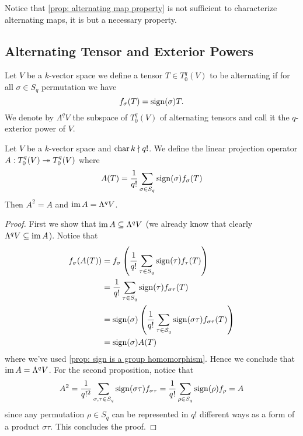 \begin{remark}
  Notice that \cref{prop: alternating map property} is not sufficient to
  characterize alternating maps, it is but a necessary property.
\end{remark}

\subsection{Alternating Tensor and Exterior Powers}

\begin{definition}
  \label{def: alternating tensor}
  Let \(V\) be a \(k\)-vector space we define a tensor \(T \in T_0^q(V)\) to be
  alternating if for all \(\sigma \in S_q\) permutation we have
  \[
    f_\sigma(T) = \operatorname{sign}(\sigma) T.
  \]
  We denote by \(\Lambda^q V\) the subspace of \(T_0^q(V)\) of alternating
  tensors and call it the \(q\)-exterior power of \(V\).
\end{definition}

\begin{proposition}
  \label{prop: alternating projection}
  Let \(V\) be a \(k\)-vector space and \(\operatorname{char} k \nmid q!\). We
  define the linear projection operator \(A: T_0^q(V) \twoheadrightarrow T_0^q(V)\) where
  \[
    A(T) = \frac{1}{q!} \sum_{\sigma \in S_q} \operatorname{sign}(\sigma)
    f_\sigma(T)
  \]
  Then \(A^2 = A\) and \(\operatorname{im} A = \Lambda^q V\).
\end{proposition}

\begin{proof}
  First we show that \(\operatorname{im} A \subseteq \Lambda^q V\) (we already know that
  clearly \(\Lambda^q V \subseteq \operatorname{im} A\)). Notice that
  \begin{align*}
    f_\sigma(A(T))
    &= f_\sigma \left( \frac 1 {q!} \sum_{\tau \in S_q}
    \operatorname{sign}(\tau) f_\tau(T) \right) \\
    &= \frac 1 {q!} \sum_{\tau \in S_q} \operatorname{sign}(\tau)
    f_{\sigma \tau}(T) \\
    &= \operatorname{sign}(\sigma) \left( \frac 1 {q!} \sum_{\tau \in \mathcal
    S_q} \operatorname{sign}(\sigma \tau) f_{\sigma \tau}(T) \right) \\
    &= \operatorname{sign}(\sigma) A(T)
  \end{align*}
  where we've used \cref{prop: sign is a group homomorphism}. Hence we conclude
  that \(\operatorname{im} A = \Lambda^q V\). For the second proposition, notice that
  \[
    A^2 = \frac 1 {q!^2} \sum_{\sigma, \tau \in S_q}
    \operatorname{sign}(\sigma \tau) f_{\sigma \tau}
    = \frac 1 {q!} \sum_{\rho \in S_q} \operatorname{sign}(\rho)
    f_\rho = A
  \]
  since any permutation \(\rho \in S_q\) can be represented in \(q!\)
  different ways as a form of a product \(\sigma \tau\). This concludes the
  proof.
\end{proof}

